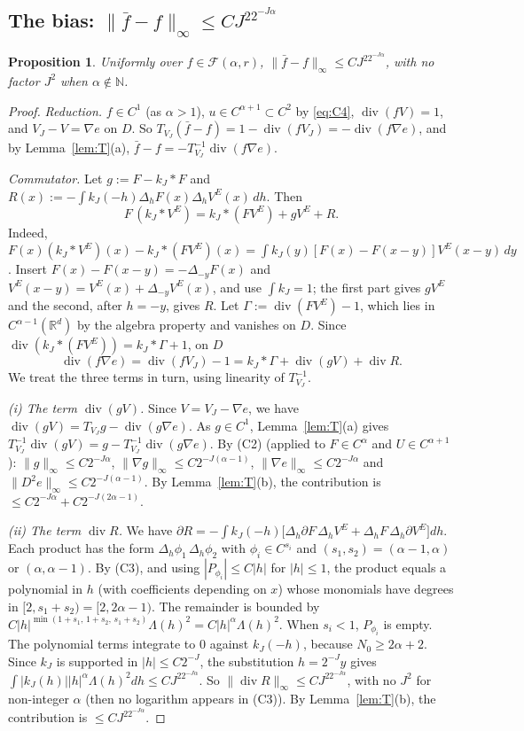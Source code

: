 \documentclass[11pt]{article}
\newtheorem{proposition}[theorem]{Proposition}
\theoremstyle{definition}
\theoremstyle{remark}
\newcommand{\R}{\mathbb R}
\newcommand{\Fc}{\mathcal F}
\newcommand{\dv}{\operatorname{div}}
\begin{document}
\subsection{\texorpdfstring{The bias: $\|\bar f-f\|_\infty\le CJ^22^{-J\alpha}$}{The bias}}

\begin{proposition}\label{prop:bias}
Uniformly over $f\in\Fc(\alpha,r)$, $\|\bar f-f\|_\infty\le CJ^22^{-J\alpha}$, with no factor $J^2$ when $\alpha\notin\mathbb N$.
\end{proposition}

\begin{proof}
\emph{Reduction.} $f\in C^1$ (as $\alpha>1$), $u\in C^{\alpha+1}\subset C^2$ by \eqref{eq:C4}, $\dv(fV)=1$, and $V_J-V=\nabla e$ on $D$. So
$T_{V_J}(\bar f-f)=1-\dv(fV_J)=-\dv(f\nabla e)$, and by Lemma~\ref{lem:T}(a), $\bar f-f=-T^{-1}_{V_J}\dv(f\nabla e)$.

\emph{Commutator.} Let $g:=F-k_J*F$ and $R(x):=-\int k_J(-h)\Delta_hF(x)\Delta_hV^E(x)\,dh$. Then
\[
F\,(k_J*V^E)=k_J*(FV^E)+gV^E+R .
\]
Indeed, $F(x)(k_J*V^E)(x)-k_J*(FV^E)(x)=\int k_J(y)[F(x)-F(x-y)]V^E(x-y)\,dy$. Insert $F(x)-F(x-y)=-\Delta_{-y}F(x)$ and $V^E(x-y)=V^E(x)+\Delta_{-y}V^E(x)$, and use $\int k_J=1$; the first part gives $gV^E$ and the second, after $h=-y$, gives $R$. Let $\Gamma:=\dv(FV^E)-1$, which lies in $C^{\alpha-1}(\R^d)$ by the algebra property and vanishes on $D$. Since $\dv(k_J*(FV^E))=k_J*\Gamma+1$, on $D$
\[
\dv(f\nabla e)=\dv(fV_J)-1=k_J*\Gamma+\dv(gV)+\dv R .
\]
We treat the three terms in turn, using linearity of $T^{-1}_{V_J}$.

\emph{(i) The term $\dv(gV)$.} Since $V=V_J-\nabla e$, we have $\dv(gV)=T_{V_J}g-\dv(g\nabla e)$. As $g\in C^1$, Lemma~\ref{lem:T}(a) gives $T^{-1}_{V_J}\dv(gV)=g-T^{-1}_{V_J}\dv(g\nabla e)$. By (C2) (applied to $F\in C^\alpha$ and $U\in C^{\alpha+1}$): $\|g\|_\infty\le C2^{-J\alpha}$, $\|\nabla g\|_\infty\le C2^{-J(\alpha-1)}$, $\|\nabla e\|_\infty\le C2^{-J\alpha}$ and $\|D^2e\|_\infty\le C2^{-J(\alpha-1)}$. By Lemma~\ref{lem:T}(b), the contribution is $\le C2^{-J\alpha}+C2^{-J(2\alpha-1)}$.

\emph{(ii) The term $\dv R$.} We have
$\partial R=-\int k_J(-h)\big[\Delta_h\partial F\,\Delta_hV^E+\Delta_hF\,\Delta_h\partial V^E\big]dh$.
Each product has the form $\Delta_h\phi_1\,\Delta_h\phi_2$ with $\phi_i\in C^{s_i}$ and $(s_1,s_2)=(\alpha-1,\alpha)$ or $(\alpha,\alpha-1)$. By (C3), and using $|P_{\phi_i}|\le C|h|$ for $|h|\le1$, the product equals a polynomial in $h$ (with coefficients depending on $x$) whose monomials have degrees in $[2,s_1+s_2)=[2,2\alpha-1)$. The remainder is bounded by
$C|h|^{\min(1+s_1,\,1+s_2,\,s_1+s_2)}\Lambda(h)^2=C|h|^\alpha\Lambda(h)^2$.
When $s_i<1$, $P_{\phi_i}$ is empty. The polynomial terms integrate to $0$ against $k_J(-h)$, because $N_0\ge2\alpha+2$. Since $k_J$ is supported in $|h|\le C2^{-J}$, the substitution $h=2^{-J}y$ gives
$\int|k_J(h)||h|^\alpha\Lambda(h)^2dh\le CJ^22^{-J\alpha}$.
So $\|\dv R\|_\infty\le CJ^22^{-J\alpha}$, with no $J^2$ for non-integer $\alpha$ (then no logarithm appears in (C3)). By Lemma~\ref{lem:T}(b), the contribution is $\le CJ^22^{-J\alpha}$.


\end{proof}
\end{document}
